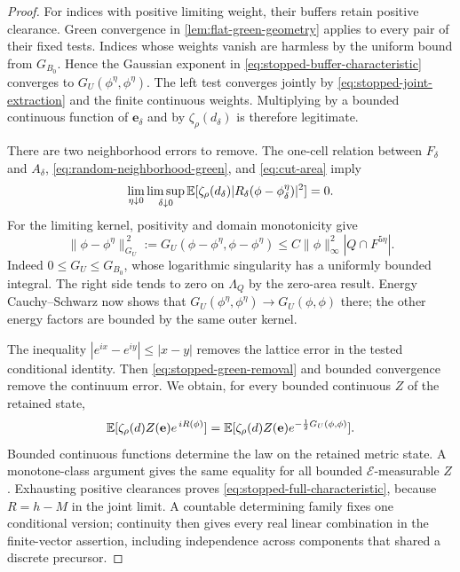 \begin{proof}
For indices with positive limiting weight, their buffers retain positive
clearance. Green convergence in \cref{lem:flat-green-geometry} applies
to every pair of their fixed tests. Indices whose weights vanish are
harmless by the uniform bound from \(G_{B_0}\). Hence the Gaussian
exponent in \eqref{eq:stopped-buffer-characteristic} converges to
\(G_U(\phi^\eta,\phi^\eta)\). The left test converges jointly by
\eqref{eq:stopped-joint-extraction} and the finite continuous weights.
Multiplying by a bounded continuous function of \(\mathbf e_\delta\)
and by \(\zeta_\rho(d_\delta)\) is therefore legitimate.

There are two neighborhood errors to remove. The one-cell relation
between \(F_\delta\) and \(A_\delta\), \eqref{eq:random-neighborhood-green},
and \eqref{eq:cut-area} imply
\[
 \lim_{\eta\downarrow0}\limsup_{\delta\downarrow0}
 \mathbb E[\zeta_\rho(d_\delta)
       |R_\delta(\phi-\phi_\delta^\eta)|^2]=0.
\]
For the limiting kernel, positivity and domain monotonicity give
\begin{equation}
 \|\phi-\phi^\eta\|_{G_U}^{\,2}
 :=G_U(\phi-\phi^\eta,\phi-\phi^\eta)
 \le C\|\phi\|_\infty^2|Q\cap F^{5\eta}|.
 \label{eq:stopped-green-removal}
\end{equation}
Indeed \(0\le G_U\le G_{B_0}\), whose logarithmic singularity has a
uniformly bounded integral. The right side tends to zero on
\(\Lambda_Q\) by the zero-area result. Energy Cauchy--Schwarz now shows
that \(G_U(\phi^\eta,\phi^\eta)\to G_U(\phi,\phi)\) there; the other
energy factors are bounded by the same outer kernel.

The inequality \(|e^{ix}-e^{iy}|\le|x-y|\) removes the lattice error
in the tested conditional identity. Then
\eqref{eq:stopped-green-removal} and bounded convergence remove the
continuum error. We obtain, for every bounded continuous \(Z\) of the
retained state,
\[
 \mathbb E[\zeta_\rho(d)Z(\mathbf e)e^{\,iR(\phi)}]
   =\mathbb E[\zeta_\rho(d)Z(\mathbf e)e^{-\frac12G_U(\phi,\phi)}].
\]
Bounded continuous functions determine the law on the retained metric
state. A monotone-class argument gives the same equality for all bounded
\(\mathscr E\)-measurable \(Z\). Exhausting positive clearances proves
\eqref{eq:stopped-full-characteristic}, because \(R=h-M\) in the joint
limit. A countable determining family fixes one conditional version;
continuity then gives every real linear combination in the finite-vector
assertion, including independence across components that shared a
discrete precursor.


\end{proof}
